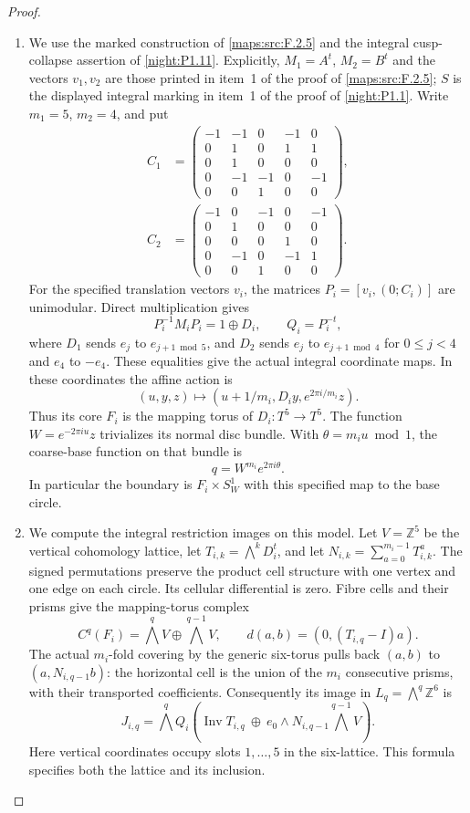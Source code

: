\documentclass[11pt,a4paper]{article}
\theoremstyle{definition}
\begin{document}
\begin{proof}
\begin{enumerate}[label=\arabic*.]
\item We use the marked construction of \cref{maps:src:F.2.5} and the
integral cusp-collapse assertion of \cref{night:P1.11}.
Explicitly, $M_1=A^t$, $M_2=B^t$ and the vectors $v_1,v_2$ are
those printed in item~1 of the proof of \cref{maps:src:F.2.5};
$S$ is the displayed integral marking in item~1 of the proof of
\cref{night:P1.1}.  Write
$m_1=5$, $m_2=4$, and put
\[
\begin{split}
C_1&=\begin{pmatrix}
-1&-1&0&-1&0\\0&1&0&1&1\\0&1&0&0&0\\
0&-1&-1&0&-1\\0&0&1&0&0
\end{pmatrix},\\[2pt]
C_2&=\begin{pmatrix}
-1&0&-1&0&-1\\0&1&0&0&0\\0&0&0&1&0\\
0&-1&0&-1&1\\0&0&1&0&0
\end{pmatrix}.
\end{split}
\]
For the specified translation vectors $v_i$, the matrices
$P_i=[v_i,(0;C_i)]$ are unimodular.  Direct multiplication gives
\[
 P_i^{-1}M_iP_i=1\oplus D_i,\qquad Q_i=P_i^{-t},
\]
where $D_1$ sends $e_j$ to $e_{j+1\bmod5}$, and $D_2$ sends
$e_j$ to $e_{j+1\bmod4}$ for $0\le j<4$ and $e_4$ to $-e_4$.
These equalities give the actual integral coordinate maps.  In these
coordinates the affine action is
\[
 (u,y,z)\longmapsto
 (u+1/m_i,D_i y,e^{2\pi i/m_i}z).
\]
Thus its core $F_i$ is the mapping torus of $D_i:T^5\to T^5$.
The function $W=e^{-2\pi i u}z$ trivializes its normal disc bundle.
With $\theta=m_i u\bmod1$, the coarse-base function on that bundle is
\[
                  q=W^{m_i}e^{2\pi i\theta}.
\]
In particular the boundary is $F_i\times S^1_W$ with this specified
map to the base circle.

\item We compute the integral restriction images on this model.
Let $V=\mathbb Z^5$ be the vertical cohomology lattice, let
$T_{i,k}=\bigwedge^kD_i^t$, and let
$N_{i,k}=\sum_{a=0}^{m_i-1}T_{i,k}^{a}$.
The signed permutations preserve the product cell structure with one
vertex and one edge on each circle.  Its cellular differential is zero.
Fibre cells and their prisms give the mapping-torus complex
\[
 C^q(F_i)=\bigwedge^qV\oplus\bigwedge^{q-1}V,
 \qquad d(a,b)=(0,(T_{i,q}-I)a).
\]
The actual $m_i$-fold covering by the generic six-torus pulls back
$(a,b)$ to $(a,N_{i,q-1}b)$: the horizontal cell is the union of the
$m_i$ consecutive prisms, with their transported coefficients.
Consequently its image in $L_q=\bigwedge^q\mathbb Z^6$ is
\[
 J_{i,q}=\bigwedge^q Q_i
 \left(\operatorname{Inv}T_{i,q}\ \oplus\
 e_0\wedge N_{i,q-1}\bigwedge^{q-1}V\right).
\]
Here vertical coordinates occupy slots $1,\ldots,5$ in the six-lattice.
This formula specifies both the lattice and its inclusion.


\end{enumerate}
\end{proof}
\end{document}
